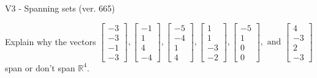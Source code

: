 \begin{exercise}
  \begin{exerciseTitle}V3 - Spanning sets (ver. 665)\end{exerciseTitle}
  \begin{exerciseStatement}
    Explain why the vectors \(\left[\begin{array}{r}
-3 \\
-3 \\
-1 \\
-3
\end{array}\right] , \left[\begin{array}{r}
-1 \\
1 \\
4 \\
-4
\end{array}\right] , \left[\begin{array}{r}
-5 \\
-4 \\
1 \\
4
\end{array}\right] , \left[\begin{array}{r}
1 \\
1 \\
-3 \\
-2
\end{array}\right] , \left[\begin{array}{r}
-5 \\
1 \\
0 \\
0
\end{array}\right] , \text{ and } \left[\begin{array}{r}
4 \\
-3 \\
2 \\
-3
\end{array}\right]\) span or don't span \(\mathbb{R}^4\). 
	



\end{exerciseStatement}
\end{exercise}
